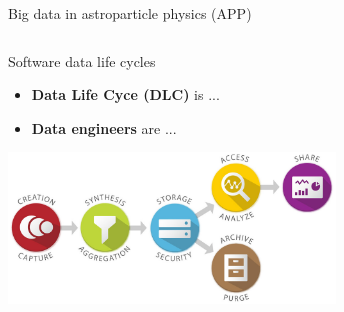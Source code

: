 \begin{frame}{Big data in astroparticle physics (APP)}
\begin{columns}
\begin{column}[t]{0.42\textwidth}
  \end{column}
\end{columns}
  \footnotesize{}
\end{frame}

\begin{frame}{Software data life cycles}%
\begin{itemize}
\item \textbf{Data Life Cyce (DLC)} is ...
\item \textbf{Data engineers} are ...
\end{itemize}

\vspace{-1ex}
\centering
\includegraphics[width=0.65\textwidth]{pics/data_lifecycle_illust.jpg}
\end{frame}

